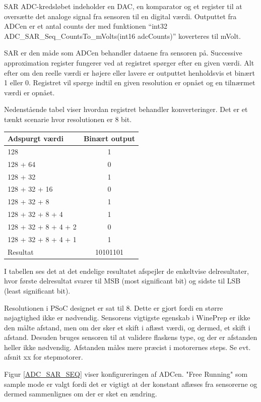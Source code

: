 SAR ADC-kredsløbet indeholder en DAC, en komparator og et register til at oversætte det analoge signal fra sensoren til en digital værdi. Outputtet fra ADCen er et antal counts der med funktionen ``int32 ADC\_SAR\_Seq\_CountsTo_mVolts(int16 adcCounts)'' koverteres til mVolt.

SAR er den måde som ADCen behandler dataene fra sensoren på. Successive approximation register fungerer ved at registret spørger efter en given værdi. Alt efter om den reelle værdi er højere eller lavere er outputtet henholdsvis et binært 1 eller 0. Registret vil spørge indtil en given resolution er opnået og en tilnærmet værdi er opnået.

Nedenstående tabel viser hvordan registret behandler konverteringer. Det er et tænkt scenarie hvor resolutionen er 8 bit.

\begin{table}
\begin{tabular}{| l | c |}
Adspurgt værdi & Binært output\\\hline
128 & 1\\\hline
128 + 64 & 0\\\hline
128 + 32 & 1\\\hline
128 + 32 + 16 & 0\\\hline
128 + 32 + 8 & 1\\\hline
128 + 32 + 8 + 4 & 1\\\hline
128 + 32 + 8 + 4 + 2 & 0\\\hline
128 + 32 + 8 + 4 + 1 & 1\\\hline
Resultat & 10101101\\\hline
\end{tabular}
\end{table}

I tabellen ses det at det endelige resultatet afspejler de enkeltvise delresultater, hvor første delresultat svarer til MSB (most significant bit) og sidste til LSB (least significant bit).

Resolutionen i PSoC designet er sat til 8. Dette er gjort fordi en større nøjagtighed ikke er nødvendig. Sensorens vigtigste egenskab i WinePrep er ikke den målte afstand, men om der sker et skift i aflæst værdi, og dermed, et skift i afstand. Desuden bruges sensoren til at validere flaskens type, og der er afstanden heller ikke nødvendig. Afstanden måles mere præcist i motorernes steps. Se evt. afsnit xx for stepmotorer.

Figur \ref{ADC_SAR_SEQ} viser konfigureringen af ADCen. "Free Running" som sample mode er valgt fordi det er vigtigt at der konstant aflæses fra sensorerne og dermed sammenlignes om der er sket en ændring.

